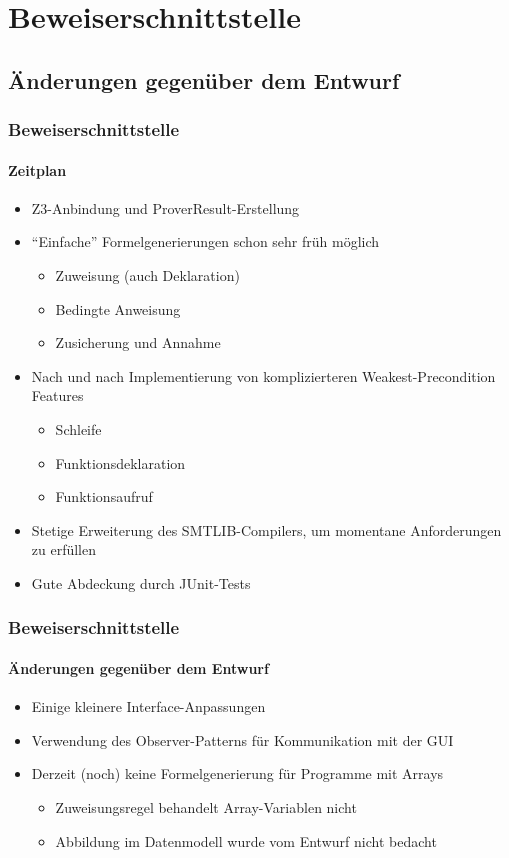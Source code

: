 \section{Beweiserschnittstelle}

\subsection{Änderungen gegenüber dem Entwurf}
\begin{frame}
\frametitle{Beweiserschnittstelle}
\framesubtitle{Zeitplan}
\begin{itemize}
    \item<+-> Z3-Anbindung und ProverResult-Erstellung
	\item<+-> ``Einfache'' Formelgenerierungen schon sehr früh möglich
    \begin{itemize}
        \item<+-> Zuweisung (auch Deklaration)
        \item<+-> Bedingte Anweisung
        \item<+-> Zusicherung und Annahme
    \end{itemize}
	\item<+-> Nach und nach Implementierung von komplizierteren Weakest-Precondition Features
    \begin{itemize}
        \item<+-> Schleife
        \item<+-> Funktionsdeklaration
        \item<+-> Funktionsaufruf
    \end{itemize}
	\item<+-> Stetige Erweiterung des SMTLIB-Compilers, um momentane Anforderungen zu erfüllen
	\item<+-> Gute Abdeckung durch JUnit-Tests
\end{itemize}
\end{frame}

\begin{frame}
\frametitle{Beweiserschnittstelle}
\framesubtitle{Änderungen gegenüber dem Entwurf}
\begin{itemize}
	\item<+-> Einige kleinere Interface-Anpassungen
	\item<+-> Verwendung des Observer-Patterns für Kommunikation mit der GUI
	\item<+-> Derzeit (noch) keine Formelgenerierung für Programme mit Arrays
    \begin{itemize}
        \item<+-> Zuweisungsregel behandelt Array-Variablen nicht
        \item<+-> Abbildung im Datenmodell wurde vom Entwurf nicht bedacht
    \end{itemize}
\end{itemize}
\end{frame}

